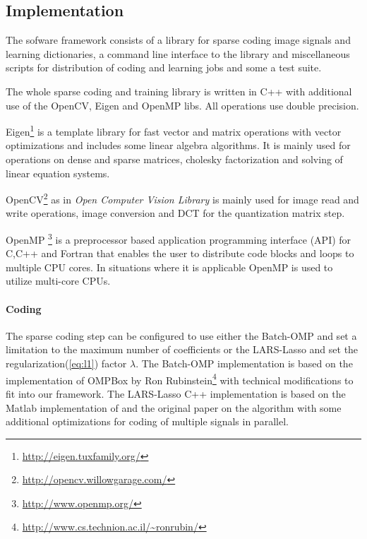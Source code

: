 \subsection{Implementation}
The sofware framework consists of a library for sparse coding image signals 
and learning dictionaries, a command line interface to the library and
miscellaneous scripts for distribution of coding and learning jobs and
some a test suite.

The whole sparse coding and training library is written in C++ with
additional use of the OpenCV, Eigen and OpenMP libs. All operations use double
precision. 

Eigen\footnote{\url{http://eigen.tuxfamily.org/}}
is a template library for fast vector and matrix operations with vector
optimizations and includes some linear algebra algorithms. It is mainly used for
operations on dense and sparse matrices, cholesky factorization and solving of
linear equation systems. 

OpenCV\footnote{\url{http://opencv.willowgarage.com/}} as
in \emph{Open Computer Vision Library} is mainly used for
image read and write operations, image conversion and DCT for the
quantization matrix step. 

OpenMP \footnote{\url{http://www.openmp.org/}} is a preprocessor
based application programming interface (API) for C,C++ and Fortran that enables
the user to distribute code blocks and loops to multiple CPU cores. In
situations where it is applicable OpenMP is used to utilize multi-core CPUs. 



\paragraph{Coding}
The sparse coding step can be configured to use either the Batch-OMP and 
set a limitation to the maximum number of coefficients or the LARS-Lasso 
and set the regularization(\ref{eq:l1}) factor $\lambda$.
The Batch-OMP implementation is based on the implementation
of OMPBox by Ron
 Rubinstein\footnote{\url{http://www.cs.technion.ac.il/~ronrubin/}} with
technical modifications to fit into our
framework. The LARS-Lasso C++ implementation is based on the Matlab
implementation of\cite{Strand2005} and the original
paper\cite{Efron2004} on the algorithm with some additional optimizations
for coding of multiple signals in parallel. 

